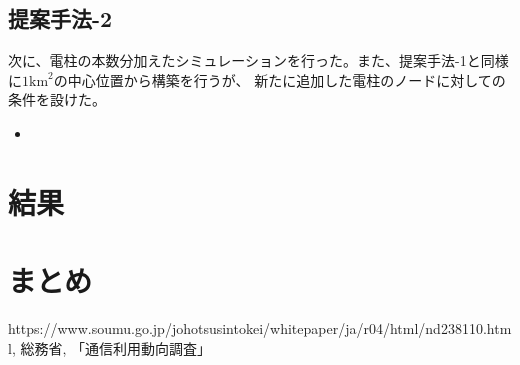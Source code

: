\documentclass[a4paper, 10pt]{ltjsarticle}
\begin{document}
\subsection{提案手法-2}
次に、電柱の本数分加えたシミュレーションを行った。また、提案手法-1と同様に$1\mathrm{km}^2$の中心位置から構築を行うが、
新たに追加した電柱のノードに対しての条件を設けた。
\begin{itemize}
  \item 
\end{itemize}

\section{結果}

\section{まとめ}

\begin{thebibliography}{9}
   https://www.soumu.go.jp/johotsusintokei/whitepaper/ja/r04/html/nd238110.html, 総務省, 「通信利用動向調査」 
\end{thebibliography}
\end{document}
